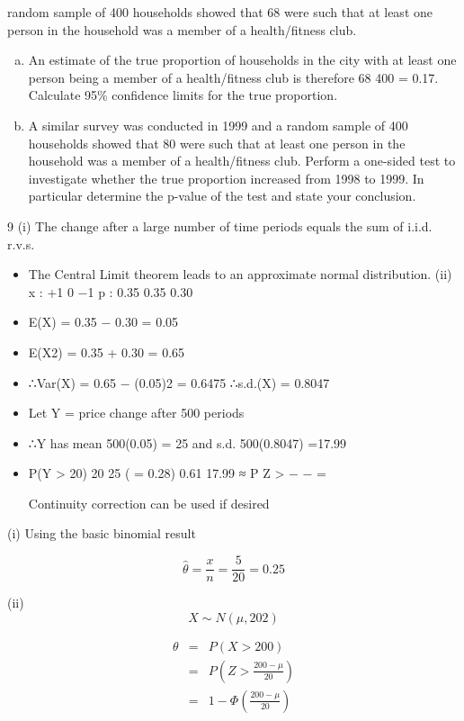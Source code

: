 \documentclass[a4paper,12pt]{article}
\begin{document}
\begin{enumerate}
random sample of 400 households showed that 68 were such that at least one
person in the household was a member of a health/fitness club.
\begin{enumerate}[(a)]
\item  An estimate of the true proportion of households in the city with at least
one person being a member of a health/fitness club is therefore
68
400
= 0.17. Calculate 95\% confidence limits for the true proportion.
\item A similar survey was conducted in 1999 and a random sample of 400
households showed that 80 were such that at least one person in the
household was a member of a health/fitness club.
Perform a one-sided test to investigate whether the true proportion
increased from 1998 to 1999. In particular determine the p-value of the
test and state your conclusion. 
\end{enumerate}
9 (i) The change after a large number of time periods equals the sum of i.i.d.
r.v.s.

\begin{itemize}
    \item The Central Limit theorem leads to an approximate normal distribution.
(ii)
x : +1 0 −1
p : 0.35 0.35 0.30
\item E(X) = 0.35 − 0.30 = 0.05
\item E(X2) = 0.35 + 0.30 = 0.65
\item ∴Var(X) = 0.65 − (0.05)2 = 0.6475 ∴s.d.(X) = 0.8047
\item Let Y = price change after 500 periods
\item ∴Y has mean 500(0.05) = 25 and s.d. 500(0.8047) =17.99
\item P(Y > 20)
20 25
( = 0.28) 0.61
17.99
≈ P Z > − − =
\item [Continuity correction can be used if desired]
\end{itemize}


\newpage



(i) Using the basic binomial result


\[  \hat{\theta} = \frac{x}{n} = \frac{5}{20} = 0.25\]


(ii) 
\[X \sim N(\mu , 202)\]

\begin{eqnarray*} 
\theta 
&=& P(X > 200) \\
&=& P \left( Z > \frac{200 -\mu}{20} \right) \\
&=& 1 - \Phi\left(  \frac{200 -\mu}{20} \right)\\
\end{eqnarray*}


\end{enumerate}
\end{document}
